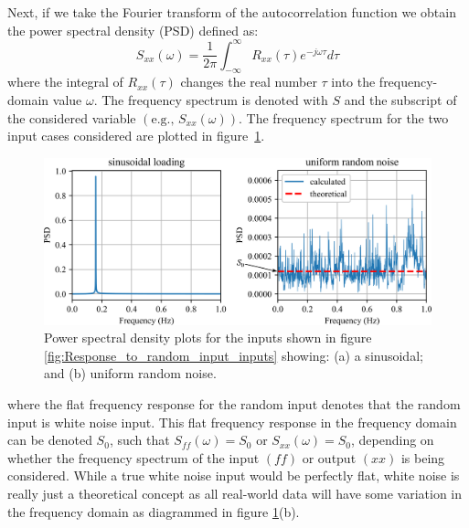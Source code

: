 \documentclass[12pt,letter]{article}
\numberwithin{ex}{section} %
\numberwithin{re}{section} %
\numberwithin{equation}{section}	%
\begin{document}
Next, if we take the Fourier transform of the autocorrelation function we obtain the power spectral density (PSD) defined as:
\begin{equation}
S_{xx}(\omega) =\frac{1}{2 \pi} \int_{-\infty}^{\infty} R_{xx}(\tau) e^{-j \omega \tau}d \tau
\end{equation}
where the integral of $R_{xx}(\tau)$ changes the real number $\tau$ into the frequency-domain value $\omega$. The frequency spectrum is denoted with $S$ and the subscript of the considered variable $(\text{e.g., }S_{xx}(\omega))$.  The frequency spectrum for the two input cases considered are plotted in figure~\ref{fig:Response_to_random_input_PSD}.
\begin{figure}[H]
	\centering
	\includegraphics[width=1\textwidth]{../figures/Response_to_random_input_PSD.png}
	\caption{Power spectral density plots for the inputs shown in figure \ref{fig:Response_to_random_input_inputs} showing: (a) a sinusoidal; and (b) uniform random noise.}
	\label{fig:Response_to_random_input_PSD}
\end{figure}
\noindent where the flat frequency response for the random input denotes that the random input is white noise input.  This flat frequency response in the frequency domain can be denoted $S_0$, such that $S_{ff}(\omega) = S_0$ or $S_{xx}(\omega) = S_0$, depending on whether the frequency spectrum of the input $(ff)$ or output  $(xx)$ is being considered. While a true white noise input would be perfectly flat, white noise is really just a theoretical concept as all real-world data will have some variation in the frequency domain as diagrammed in figure \ref{fig:Response_to_random_input_PSD}(b). 
\end{document}
